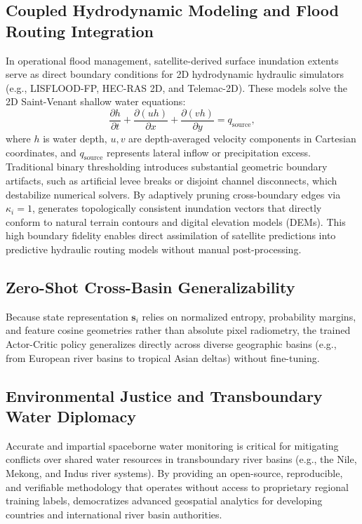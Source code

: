 \subsection{Coupled Hydrodynamic Modeling and Flood Routing Integration}
In operational flood management, satellite-derived surface inundation extents serve as direct boundary conditions for 2D hydrodynamic hydraulic simulators (e.g., LISFLOOD-FP, HEC-RAS 2D, and Telemac-2D). These models solve the 2D Saint-Venant shallow water equations:
\begin{equation}
    \frac{\partial h}{\partial t} + \frac{\partial (uh)}{\partial x} + \frac{\partial (vh)}{\partial y} = q_{\text{source}},
\end{equation}
where $h$ is water depth, $u, v$ are depth-averaged velocity components in Cartesian coordinates, and $q_{\text{source}}$ represents lateral inflow or precipitation excess. Traditional binary thresholding introduces substantial geometric boundary artifacts, such as artificial levee breaks or disjoint channel disconnects, which destabilize numerical solvers. By adaptively pruning cross-boundary edges via $\kappa_i=1$, \rllctim{} generates topologically consistent inundation vectors that directly conform to natural terrain contours and digital elevation models (DEMs). This high boundary fidelity enables direct assimilation of satellite predictions into predictive hydraulic routing models without manual post-processing.

\subsection{Zero-Shot Cross-Basin Generalizability}
Because state representation $\mathbf{s}_i$ relies on normalized entropy, probability margins, and feature cosine geometries rather than absolute pixel radiometry, the trained Actor-Critic policy generalizes directly across diverse geographic basins (e.g., from European river basins to tropical Asian deltas) without fine-tuning.

\subsection{Environmental Justice and Transboundary Water Diplomacy}
Accurate and impartial spaceborne water monitoring is critical for mitigating conflicts over shared water resources in transboundary river basins (e.g., the Nile, Mekong, and Indus river systems). By providing an open-source, reproducible, and verifiable methodology that operates without access to proprietary regional training labels, \rllctim{} democratizes advanced geospatial analytics for developing countries and international river basin authorities.
